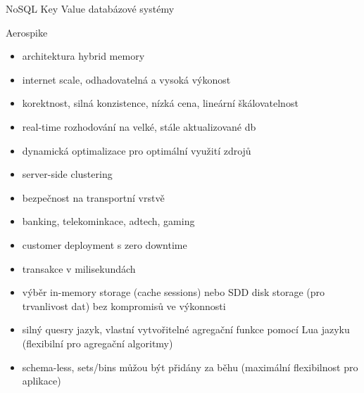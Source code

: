 \documentclass{article}
\begin{document}
\begin{section}{NoSQL Key Value databázové systémy}
		\begin{subsection}{Aerospike}
			\begin{itemize}
				\item architektura hybrid memory
				\item internet scale, odhadovatelná a vysoká výkonost
				\item korektnost, silná konzistence, nízká cena, lineární škálovatelnost
				\item real-time rozhodování na velké, stále aktualizované db
				\item dynamická optimalizace pro optimální využití zdrojů
				\item server-side clustering
				\item bezpečnost na transportní vrstvě
				\item banking, telekominkace, adtech, gaming
				\item customer deployment s zero downtime
				\item transakce v milisekundách
				\item výběr in-memory storage (cache sessions) nebo SDD disk storage (pro trvanlivost dat) bez kompromisů ve výkonnosti
				\item silný quesry jazyk, vlastní vytvořitelné agregační funkce pomocí Lua jazyku (flexibilní pro agregační algoritmy)
				\item schema-less, sets/bins můžou být přidány za běhu (maximální flexibilnost pro aplikace)
			\end{itemize}
		\end{subsection}
		

\end{section}
\end{document}
